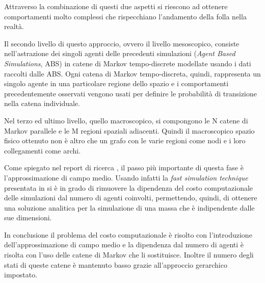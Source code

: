 Attraverso la combinazione di questi due aspetti si riescono ad ottenere comportamenti molto complessi che rispecchiano l'andamento della folla nella realtà.

Il secondo livello di questo approccio, ovvero il livello mesoscopico, consiste nell'astrazione dei singoli agenti delle precedenti simulazioni (\textit{Agent Based Simulations}, ABS) in catene di Markov tempo-discrete modellate usando i dati raccolti dalle ABS. Ogni catena di Markov tempo-discreta, quindi, rappresenta un singolo agente in una particolare regione dello spazio e i comportamenti precedentemente osservati vengono usati per definire le probabilità di transizione nella catena individuale.

Nel terzo ed ultimo livello, quello macroscopico, si compongono le N catene di Markov parallele e le M regioni spaziali adiacenti. Quindi il macroscopico spazio fisico ottenuto non è altro che un grafo con le varie regioni come nodi e i loro collegamenti come archi.

Come spiegato nel report di ricerca \cite{hierarchical-report}, il passo più importante di questa fase è l'approssimazione di campo medio. Usando infatti la \textit{fast simulation technique} presentata in \cite{mean-field} si è in grado di rimuovere la dipendenza del costo computazionale delle simulazioni dal numero di agenti coinvolti, permettendo, quindi, di ottenere una soluzione analitica per la simulazione di una massa che è indipendente dalle sue dimensioni.

In conclusione il problema del costo computazionale è risolto con l'introduzione dell'approssimazione di campo medio e la dipendenza dal numero di agenti è risolta con l'uso delle catene di Markov che li sostituisce. Inoltre il numero degli stati di queste catene è mantenuto basso grazie all'approccio gerarchico impostato.

